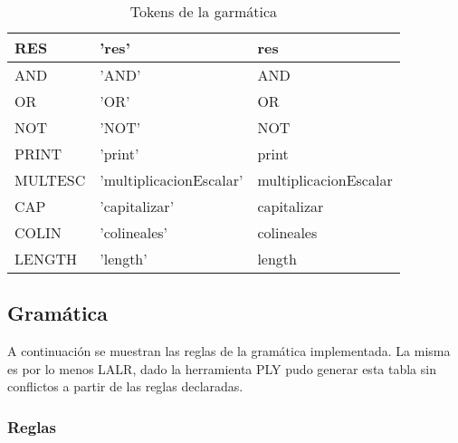 \begin{table}[!htb]
\begin{center}
\begin{tabular}{| l | l | l |}
\hline
RES & 'res' & res \\
\hline
AND & 'AND'& AND \\
\hline
OR & 'OR' & OR \\
\hline
NOT 	& 'NOT' & NOT \\
\hline
PRINT & 'print' & print \\
\hline
MULTESC & 'multiplicacionEscalar' & multiplicacionEscalar\\
\hline
CAP & 'capitalizar' & capitalizar \\
\hline
COLIN & 'colineales' & colineales \\
\hline
LENGTH & 'length' & length \\
\hline

\end{tabular}
\end{center}
\caption{Tokens de la garmática}\label{tab-tokens}
\end{table}



\subsection{Gramática}

A continuación se muestran las reglas de la gramática implementada.  La misma es por lo menos LALR, dado la herramienta PLY pudo generar esta tabla sin conflictos a partir de las reglas declaradas.

\subsubsection{Reglas}


